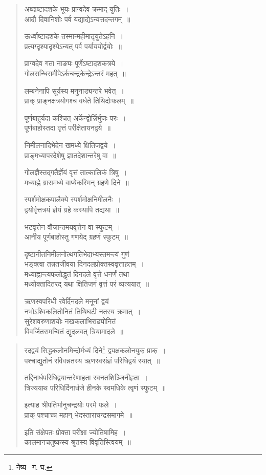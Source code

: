 \documentclass[11pt, openany]{book}
\begin{document}
\begin{quote}
{\qt अब्दाष्टादशके भूयः प्राग्वदेव क्रमाद् युतिः~।\\
 आदौ दिवानिशोः पर्व यद्याद्येऽन्यत्तदन्तगम्~॥
 
ऊर्ध्वाष्टादशके तस्मान्महीमातृयुतेऽहनि~।\\
प्रत्यग्दृश्यादृश्येऽन्यत् पर्व पर्याययोर्द्वयोः~॥
 
प्राग्वदेव गता नाङ्यः पूर्णेऽष्टादशकत्रये~।\\
गोलसन्धिसमीपेऽर्कचन्द्रकेन्द्रेऽन्तरं महत्~॥
 
लम्बनेनापि सूर्यस्य मनुनाड्यन्तरे भवेत्~।\\
प्राक् प्राङ्नक्षत्रयोगश्च वर्धते तिथिदोःफलम्~॥
 
पूर्णबाहुर्यदा कश्चित् अर्केन्द्वोर्न्निर्भुजः परः~।\\
पूर्णबाहोस्तदा वृत्तं परीक्षेतायनद्वये~॥
 
निमीलनादिभेदेन खमध्ये क्षितिजद्वये~।\\
प्राङ्मध्यापरदेशेषु ज्ञातदेशान्तरेषु वा~॥
 
गोलज्ञैस्तद्गतैर्ज्ञेयं वृत्तं तात्कालिकं त्रिषु~।\\
मध्याह्ने ग्रासमध्ये वाप्येकस्मिन् ग्रहणे दिने~॥
 
स्पर्शमोक्षकपालैक्ये स्पर्शमोक्षनिमीलनैः~।\\
द्वयोर्वृत्तत्रयं ज्ञेयं ग्रहे कस्यापि तद्यथा~॥
 
भटवृत्तेन वौजान्तमयवृत्तेन वा स्फुटम्~।\\
आनीय पूर्णबाहोस्तु गणयेद् ग्रहणं स्फुटम्~॥
 
दृष्टानीतनिमीलनोत्थगतिभेदाभ्यस्तमन्त्यं गुणं\\
भङ्क्त्वा तन्नतजीवया दिनदलप्रोक्तस्ववृत्ताहतम्~।\\
मध्याह्नान्त्यफलोद्धृतं दिनदले वृत्ते धनर्णं तथा\\
मध्योक्तादितरद् यथा क्षितिजगं वृत्तं परं व्यत्ययात्~॥ 

ऋणस्वपरिधी रवेर्दिनदले मनूनां द्वयं\\
नभोऽश्विकलितोनितं तिथिघटी नतस्य क्रमात्~। \\
सुरेशवरुणाशयोः नखकलाभिराढ्योनितं\\
विवर्जितसमन्वितं द्युदलवत् त्रियामादले~॥}
\end{quote}

\newpage

\begin{quote}
{\qt रदद्वयं सिद्धकलोनमिन्दोर्मध्यं दिने\renewcommand{\thefootnote}{१}\footnote{नेष्य \textendash\ ग. घ.} द्व्यक्षकलोनयुक् प्राक्~।\\
पश्चाद्युतोनं रविवन्नतस्य ऋणस्वसंज्ञं परिधिद्वयं स्यात्~॥
 
तद्दिनार्धपरिधिद्वयान्तरेणाहता स्वनतशिञ्जिनीहृता~।\\
त्रिज्ययाथ परिधिर्दिनार्धजे हीनके स्वमधिके त्वृणं स्फुटम्~॥
 
इत्याह श्रीपतिर्भानुचन्द्रयोः परमे फले~।\\
प्राक् पश्चाच्च महान् भेदस्ताराचन्द्रसमागमे~॥
 
इति संक्षेपतः प्रोक्ता परीक्षा ज्योतिषामिह~।\\
कालमानचतुष्कस्य श्रुतस्य विवृतिस्त्वियम्~॥}

\end{quote}
\end{document}
